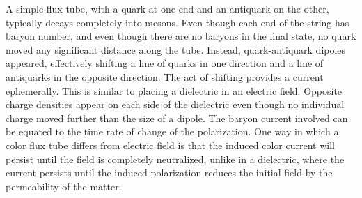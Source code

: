 \documentclass[aps, prc, 12pt, nofootinbib, showpacs, superscriptaddress, tightenlines, groupedaddress]{revtex4-2}
\begin{document}
A simple flux tube, with a quark at one end and an antiquark on the other, typically decays completely into mesons. Even though each end of the string has baryon number, and even though there are no baryons in the final state, no quark moved any significant distance along the tube. Instead, quark-antiquark dipoles appeared, effectively shifting a line of quarks in one direction and a line of antiquarks in the opposite direction. The act of shifting provides a current ephemerally. This is similar to placing a dielectric in an electric field. Opposite charge densities appear on each side of the dielectric even though no individual charge moved further than the size of a dipole. The baryon current involved can be equated to the time rate of change of the polarization. One way in which a color flux tube differs from electric field is that the induced color current will persist until the field is completely neutralized, unlike in a dielectric, where the current persists until the induced polarization reduces the initial field by the permeability of the matter.
\end{document}
